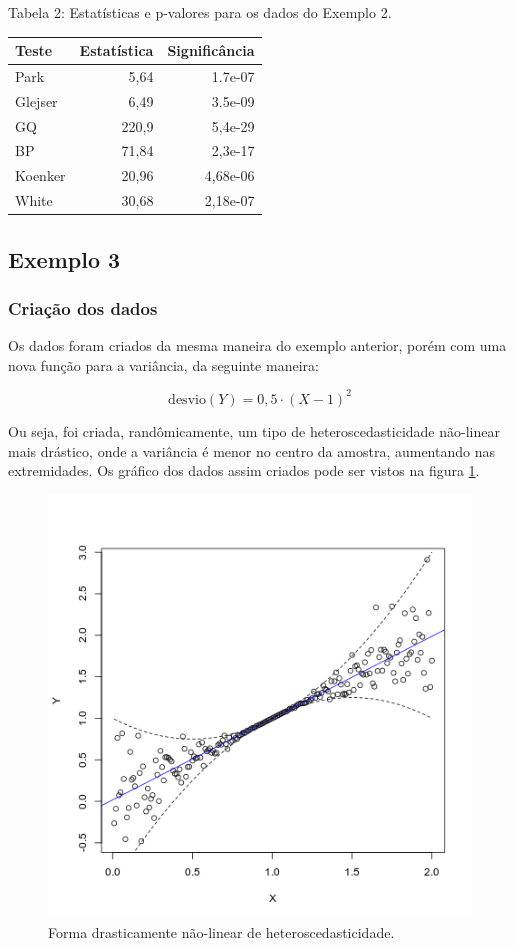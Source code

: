\documentclass[a4paper, 12pt]{article}
\begin{document}
\centerline{Tabela 2: Estatísticas e p-valores para os dados do Exemplo 2.}

\begin{longtable}[]{@{}lrr@{}}
\toprule
Teste & Estatística & Significância\tabularnewline
\midrule
\endhead
Park & 5,64 & 1.7e-07\tabularnewline
Glejser & 6,49 & 3.5e-09\tabularnewline
GQ & 220,9 & 5,4e-29\tabularnewline
BP & 71,84 & 2,3e-17\tabularnewline
Koenker & 20,96 & 4,68e-06\tabularnewline
White & 30,68 & 2,18e-07\tabularnewline
\bottomrule
\end{longtable}

\hypertarget{exemplo-3}{%
\subsection{Exemplo 3}\label{exemplo-3}}

\hypertarget{criacao-dos-dados-2}{%
\subsubsection{Criação dos dados}\label{criacao-dos-dados-2}}

Os dados foram criados da mesma maneira do exemplo anterior, porém com
uma nova função para a variância, da seguinte maneira:

\[\mathrm{desvio}(Y) = 0,5 \cdot (X-1)^2\]

Ou seja, foi criada, randômicamente, um tipo de heteroscedasticidade
não-linear mais drástico, onde a variância é menor no centro da amostra,
aumentando nas extremidades. Os gráfico dos dados assim criados pode ser
vistos na figura \ref{fig:hetero3}.

\begin{figure}[H]

{\centering \includegraphics[width=0.6\linewidth]{images/hetero3-1} 

}

\caption{Forma drasticamente não-linear de heteroscedasticidade.}\label{fig:hetero3}
\end{figure}
\end{document}
